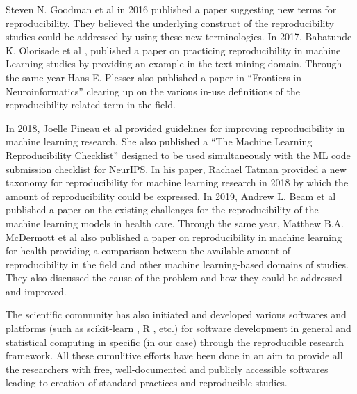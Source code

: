 Steven N. Goodman et al in 2016 \cite{goodman_what_2016} published a paper suggesting new terms for reproducibility. 
They believed the underlying construct of the reproducibility studies could be addressed by using these new terminologies. 
In 2017, Babatunde K. Olorisade et al \cite{olorisade_reproducibility_2017}, published a paper on practicing reproducibility 
in machine Learning studies by providing an example in the text mining domain. Through the same year 
Hans E. Plesser \cite{plesser_reproducibility_2018} also published a paper in “Frontiers in Neuroinformatics” 
clearing up on the various in-use definitions of the reproducibility-related term in the field.

In 2018, Joelle Pineau et al \cite{pineau_improving_2020} provided guidelines for improving reproducibility in 
machine learning research. She also published a “The Machine Learning Reproducibility Checklist”  designed to be used 
simultaneously with the ML code submission checklist for NeurIPS. In his paper, Rachael Tatman \cite{tatman_practical_2018} 
provided a new taxonomy for reproducibility for machine learning research in 2018 by which the amount of reproducibility 
could be expressed. In 2019, Andrew L. Beam et al \cite{beam_challenges_2020} published a paper on the existing 
challenges for the reproducibility of the machine learning models in health care. Through the same year, 
Matthew B.A. McDermott et al \cite{mcdermott_reproducibility_2019} also published a paper on reproducibility in 
machine learning for health providing a comparison between the available amount of reproducibility in the field 
and other machine learning-based domains of studies. They also discussed the cause of the problem and how they 
could be addressed and improved.

The scientific community has also initiated and developed various softwares and platforms (such as scikit-learn 
\cite{pedregosa_scikit-learn_2018}, R \cite{chambers_software_2008},  etc.) for software development in general and 
statistical computing in specific (in our case) through the reproducible research framework. All these cumulitive 
efforts have been done in an aim to provide all the researchers with free, well-documented and publicly accessible 
softwares leading to creation of standard practices and reproducible studies.
